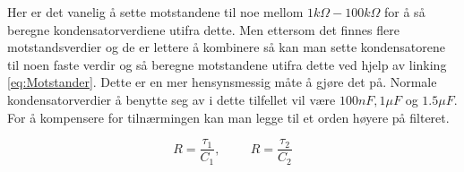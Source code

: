 Her er det vanelig å sette motstandene til noe mellom $1k\Omega - 100k\Omega$ for å så beregne kondensatorverdiene utifra dette. Men ettersom det finnes flere motstandsverdier og de er lettere å kombinere så kan man sette kondensatorene til noen faste verdir og så beregne motstandene utifra dette ved hjelp av linking \ref{eq:Motstander}. Dette er en mer hensynsmessig måte å gjøre det på. Normale kondensatorverdier å benytte seg av i dette tilfellet vil være $100nF, 1\mu F$ og $1.5\mu F$. For å kompensere for tilnærmingen kan man legge til et orden høyere på filteret.

\begin{equation}
    R=\frac{\tau_1}{C_1}, \hspace{1cm} R=\frac{\tau_2}{C_2}
    \label{eq:Motstander}
\end{equation}

